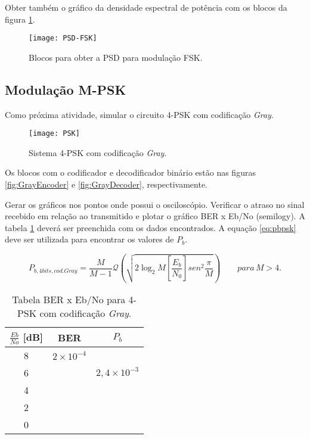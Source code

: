 Obter também o gráfico da densidade espectral de potência com os blocos da figura \ref{fig:PSD-FSK}.

\begin{figure}[H]
    \centering
    \texttt{[image: PSD-FSK]}
    \caption{Blocos para obter a PSD para modulação FSK.}
    \label{fig:PSD-FSK}
\end{figure}

\subsection{Modulação M-PSK}
Como próxima atividade, simular o circuito 4-PSK com codificação \textit{Gray}.

\begin{figure}[H]
    \centering
    \texttt{[image: PSK]}
    \caption{Sistema 4-PSK com codificação \textit{Gray}.}
    \label{fig:PSK}
\end{figure}

Os blocos com o codificador e decodificador binário estão nas figuras \ref{fig:GrayEncoder} e \ref{fig:GrayDecoder}, respectivamente.

Gerar os gráficos nos pontos onde possui o osciloscópio. Verificar o atraso no sinal recebido em relação ao transmitido e plotar o gráfico BER x Eb/No (semilogy). A tabela \ref{tab:3} deverá ser preenchida com os dados encontrados.
A equação \ref{eq:pbpsk} deve ser utilizada para encontrar os valores de $P_b$.


\begin{equation}
\label{eq:pbfsk}
P_{b,4 bits, cod. Gray} = \frac{M}{M-1}\mathcal{Q}\left(\sqrt{2 \log_2 M \left[\frac{E_b}{N_0}\right]sen^2\frac{\pi}{M}} \right) \qquad para \, M > 4.
\end{equation}


\begin{small}
    \begin{table}[H]
        \begin{center}
            \caption{Tabela BER x Eb/No para 4-PSK com codificação \textit{Gray}.}
            \begin{tabular}{c|c|c}
                \hline
                $\frac{Eb}{No}$ [dB] & BER & $P_b$ \\
                \hline
                8 & $2 \times 10^{-4}$ & \\
                \hline
                6 & & $2,4 \times 10^{-3}$ \\
                \hline
                4 & & \\
                \hline
                2 & & \\
                \hline
                0 & & \\
                \hline
            \end{tabular}
            \label{tab:3}
        \end{center}
    \end{table}
\end{small}


